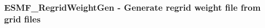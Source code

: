  
\setlength{\oldparskip}{\parskip}
\setlength{\parskip}{1.5ex}
\setlength{\oldparindent}{\parindent}
\setlength{\parindent}{0pt}
\setlength{\oldbaselineskip}{\baselineskip}
\setlength{\baselineskip}{11pt}
 
\def\bv{\begin{verbatim}}
\def\ev{\end{verbatim}}
\def\be{\begin{equation}}
\def\ee{\end{equation}}
\def\bea{\begin{eqnarray}}
\def\eea{\end{eqnarray}}
\def\bi{\begin{itemize}}
\def\ei{\end{itemize}}
\def\bn{\begin{enumerate}}
\def\en{\end{enumerate}}
\def\bd{\begin{description}}
\def\ed{\end{description}}
\def\({\left (}
\def\){\right )}
\def\[{\left [}
\def\]{\right ]}
\def\<{\left  \langle}
\def\>{\right \rangle}
\def\cI{{\cal I}}
\def\diag{\mathop{\rm diag}}
\def\tr{\mathop{\rm tr}}


 
\subsubsection [ESMF\_RegridWeightGen] {ESMF\_RegridWeightGen - Generate regrid weight file from grid files}


